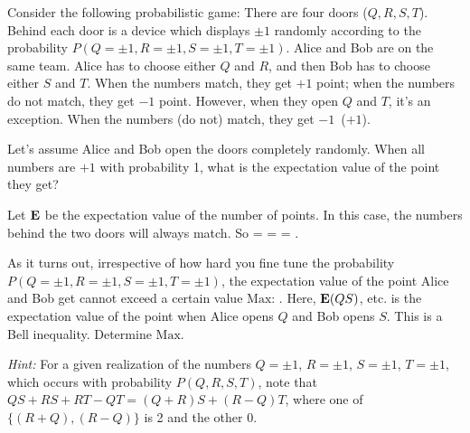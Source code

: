 \newcommand{\vE}{\vb{E}}
\newcommand{\vS}{\vb{S}}
\newcommand{\vSA}{\vS^A}
\newcommand{\vSB}{\vS^B}
\newcommand{\Max}{\text{Max}}
\newcommand{\kpsi}{\ket{\psi}}
\newcommand{\up}{\uparrow}
\newcommand{\dn}{\downarrow}
\newcommand{\kupz}{\ket{\up_z}}
\newcommand{\kdnz}{\ket{\dn_z}}
\newcommand{\Sx}{S_x}
\newcommand{\Sz}{S_z}
\newcommand{\SxA}{\Sx^A}
\newcommand{\SzA}{\Sz^A}
\newcommand{\SxB}{\Sx^B}
\newcommand{\SzB}{\Sz^B}
\newcommand{\dhf}{\dfrac{1}{2}}

\begin{statement}{}
	Consider the following probabilistic game: There are four doors ($Q, R, S, T$).  Behind each door is a device which displays $\pm 1$ randomly according to the probability $P(Q=\pm1, R=\pm1, S=\pm1, T=\pm1)$.  Alice and Bob are on the same team.  Alice has to choose either $Q$ and $R$, and then Bob has to choose either $S$ and $T$.  When the numbers match, they get $+1$ point; when the numbers do not match, they get $-1$ point.  However, when they open $Q$ and $T$, it's an exception.  When the numbers (do not) match, they get $-1$~($+1$).
\end{statement}

\begin{problem} \label{1.1}
	Let's assume Alice and Bob open the doors completely randomly.  When all numbers are $+1$ with probability 1, what is the expectation value of the point they get?
\end{problem}

\begin{solution}
	Let $\vE$ be the expectation value of the number of points.  In this case, the numbers behind the two doors will always match.  So
	\beq
		\vE = 
		= 
		= .
	\eeq
	\vfix
\end{solution}



\begin{problem}
	As it turns out, irrespective of how hard you fine tune the probability $P(Q=\pm1, R=\pm1, S=\pm1, T=\pm1)$, the expectation value of the point Alice and Bob get cannot exceed a certain value $\Max$:
	\beq
		\frac{\vE(QS) + \vE(RS) + \vE(RT) - \vE(QT)}{4} \leq \Max.
	\eeq
	Here, $\vE(QS)$, etc. is the expectation value of the point when Alice opens $Q$ and Bob opens $S$.  This is a Bell inequality.  Determine $\Max$.
	
	\emph{Hint:} For a given realization of the numbers $Q = \pm1$, $R = \pm1$, $S = \pm1$, $T = \pm1$, which occurs with probability $P(Q, R, S, T)$, note that $QS + RS + RT - QT = (Q+R)S + (R-Q)T$, where one of $\{(R+Q), (R-Q)\}$ is 2 and the other 0.
\end{problem}

